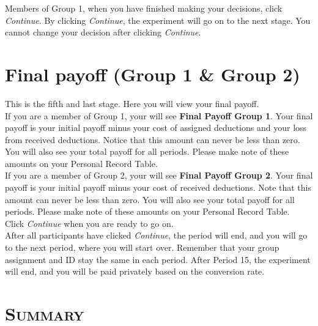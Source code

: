 \documentclass[12pt]{article}
\begin{document}
Members of Group 1, when you have finished making your decisions, click {\em Continue}.  By clicking {\em Continue}, the experiment will go on to the next stage.  You cannot change your decision after clicking {\em Continue}.

\newpage

\section{Final payoff (Group 1 \& Group 2)}

This is the fifth and last stage.  Here you will view your final payoff.\\

If you are a member of Group 1, your will see {\bf Final Payoff Group 1}.  Your final payoff is your initial payoff minus your cost of assigned deductions and your loss from received deductions.  Notice that this amount can never be less than zero.  You will also see your total payoff for all periods.  Please make note of these amounts on your Personal Record Table.\\

If you are a member of Group 2, your will see {\bf Final Payoff Group 2}.  Your final payoff is your initial payoff minus your cost of received deductions. Note that this amount can never be less than zero.  You will also see your total payoff for all periods.  Please make note of these amounts on your Personal Record Table.\\
  
Click {\em Continue} when you are ready to go on.\\
 
After all participants have clicked {\em Continue}, the period will end, and you will go to the next period, where you will start over. Remember that your group assignment and ID stay the same in each period.  After Period 15, the experiment will end, and you will be paid privately based on the conversion rate.\\



\newpage

\section*{\scshape Summary}
\end{document}
